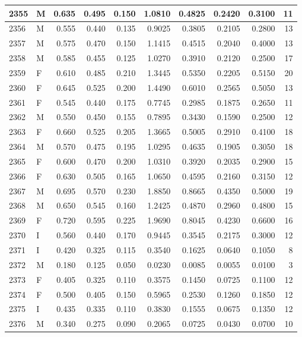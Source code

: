 \documentclass[9pt,twocolumn,twoside,]{pnas-new}
\begin{document}
\begin{tabular}{l|l|r|r|r|r|r|r|r|r}
\hline
2355 & M & 0.635 & 0.495 & 0.150 & 1.0810 & 0.4825 & 0.2420 & 0.3100 & 11\\
\hline
2356 & M & 0.555 & 0.440 & 0.135 & 0.9025 & 0.3805 & 0.2105 & 0.2800 & 13\\
\hline
2357 & M & 0.575 & 0.470 & 0.150 & 1.1415 & 0.4515 & 0.2040 & 0.4000 & 13\\
\hline
2358 & M & 0.585 & 0.455 & 0.125 & 1.0270 & 0.3910 & 0.2120 & 0.2500 & 17\\
\hline
2359 & F & 0.610 & 0.485 & 0.210 & 1.3445 & 0.5350 & 0.2205 & 0.5150 & 20\\
\hline
2360 & F & 0.645 & 0.525 & 0.200 & 1.4490 & 0.6010 & 0.2565 & 0.5050 & 13\\
\hline
2361 & F & 0.545 & 0.440 & 0.175 & 0.7745 & 0.2985 & 0.1875 & 0.2650 & 11\\
\hline
2362 & M & 0.550 & 0.450 & 0.155 & 0.7895 & 0.3430 & 0.1590 & 0.2500 & 12\\
\hline
2363 & F & 0.660 & 0.525 & 0.205 & 1.3665 & 0.5005 & 0.2910 & 0.4100 & 18\\
\hline
2364 & M & 0.570 & 0.475 & 0.195 & 1.0295 & 0.4635 & 0.1905 & 0.3050 & 18\\
\hline
2365 & F & 0.600 & 0.470 & 0.200 & 1.0310 & 0.3920 & 0.2035 & 0.2900 & 15\\
\hline
2366 & F & 0.630 & 0.505 & 0.165 & 1.0650 & 0.4595 & 0.2160 & 0.3150 & 12\\
\hline
2367 & M & 0.695 & 0.570 & 0.230 & 1.8850 & 0.8665 & 0.4350 & 0.5000 & 19\\
\hline
2368 & M & 0.650 & 0.545 & 0.160 & 1.2425 & 0.4870 & 0.2960 & 0.4800 & 15\\
\hline
2369 & F & 0.720 & 0.595 & 0.225 & 1.9690 & 0.8045 & 0.4230 & 0.6600 & 16\\
\hline
2370 & I & 0.560 & 0.440 & 0.170 & 0.9445 & 0.3545 & 0.2175 & 0.3000 & 12\\
\hline
2371 & I & 0.420 & 0.325 & 0.115 & 0.3540 & 0.1625 & 0.0640 & 0.1050 & 8\\
\hline
2372 & M & 0.180 & 0.125 & 0.050 & 0.0230 & 0.0085 & 0.0055 & 0.0100 & 3\\
\hline
2373 & F & 0.405 & 0.325 & 0.110 & 0.3575 & 0.1450 & 0.0725 & 0.1100 & 12\\
\hline
2374 & F & 0.500 & 0.405 & 0.150 & 0.5965 & 0.2530 & 0.1260 & 0.1850 & 12\\
\hline
2375 & I & 0.435 & 0.335 & 0.110 & 0.3830 & 0.1555 & 0.0675 & 0.1350 & 12\\
\hline
2376 & M & 0.340 & 0.275 & 0.090 & 0.2065 & 0.0725 & 0.0430 & 0.0700 & 10\\

\end{tabular}
\end{document}
